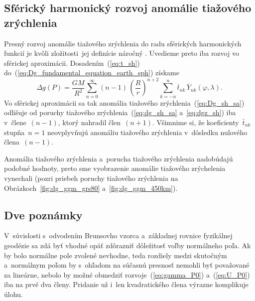\documentclass[a4paper,12pt]{book}
\begin{document}
\subsection{Sférický harmonický rozvoj anomálie tiažového zrýchlenia}

Presný rozvoj anomálie tiažového zrýchlenia do radu sférických harmonických 
funkcií je kvôli zložitosti~jej definície náročný \parencite[pozri 
napríklad][]{Barthelmes2013}.  Uvedieme preto iba rozvoj vo sférickej 
aproximácii.  Dosadením~(\ref{eq:t_sh}) 
do~(\ref{eq:Dg_fundamental_equation_earth_sph}) získame
%
\begin{equation}
\label{eq:Dg_sh_sa}
\Delta g(P) = \frac{GM}{R^2} \sum_{n = 0}^\infty (n - 1) \, \left( \frac{R}{r} 
\right)^{n + 2} \sum_{k = -n}^{n} \bar{t}_{nk} \, \bar{Y}_{nk}(\varphi, 
\lambda){.}
\end{equation}
%
Vo sférickej aproximácii sa tak anomália tiažového 
zrýchlenia~(\ref{eq:Dg_sh_sa}) odlišuje od poruchy tiažového 
zrýchlenia~(\ref{eq:dg_sh_sa} a~\ref{eq:dgz_sh}) iba v~člene~$(n - 1)$, ktorý 
nahradil člen~$(n + 1)$.  Všimnime si, že  koeficienty~$\bar{t}_{nk}$ stupňa~$n 
= 1$ neovplyvňujú anomáliu tiažového zrýchlenia v~dôsledku nulového člena~$(n 
- 1)$.

Anomália tiažového zrýchlenia a~porucha tiažového zrýchlenia nadobúdajú podobné 
hodnoty, preto sme vyobrazenie anomálie tiažového zrýchelenia vynechali (pozri 
priebeh poruchy tiažového zrýchlenia na Obrázkoch~\ref{fig:dg_ggm_grs80} 
a~\ref{fig:dg_ggm_450km}).



\subsection*{Dve poznámky}

V~súvislosti s~odvodením Brunsovho vzorca a~základnej rovnice fyzikálnej 
geodézie sa zdá byť vhodné opäť zdôrazniť dôležitosť voľby normálneho poľa.  Ak 
by bolo normálne pole zvolené nevhodne, teda rozdiely medzi skutočným 
a~normálnym poľom by s~ohľadom na súčasnú presnosť nemohli byť považované za 
lineárne, nebolo by možné obmedziť rozvoje~(\ref{eq:gamma_P0}) 
a~(\ref{eq:U_P0}) iba na prvé dva členy.  Pridanie už i~len kvadratického člena 
výrazne komplikuje úlohu.
\end{document}
